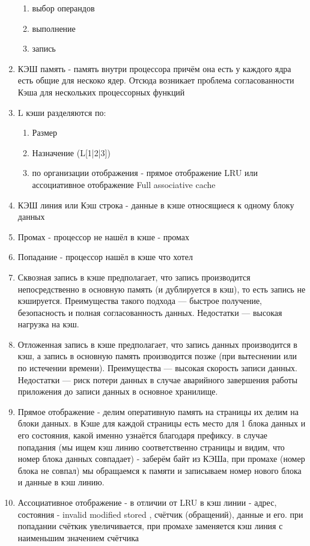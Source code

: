 \documentclass[a4paper,10pt]{article}
\begin{document}
\begin{enumerate}
\begin{enumerate}
        \item выбор операндов
        \item выполнение
        \item запись
    \end{enumerate}
    \item КЭШ память - память внутри процессора причём она есть у каждого ядра есть общие для нескоко ядер. Отсюда возникает проблема согласованности Кэша для нескольких процессорных функций
    \item L кэши разделяются по:
    \begin{enumerate}
        \item Размер
        \item Назначение (L[1|2|3])
        \item по организации отображения - прямое отображение LRU или ассоциативное отображение Full associative cache
    \end{enumerate}
    \item КЭШ линия или Кэш строка - данные в кэше относящиеся к одному блоку данных
    \item Промах - процессор не нашёл в кэше - промах
    \item Попадание - процессор нашёл в кэше что хотел
    \item Сквозная запись в кэше предполагает, что запись производится непосредственно в основную память (и дублируется в кэш), то есть запись не кэшируется. Преимущества такого подхода — быстрое получение, безопасность и полная согласованность данных. Недостатки — высокая нагрузка на кэш.
    \item Отложенная запись в кэше предполагает, что запись данных производится в кэш, а запись в основную память производится позже (при вытеснении или по истечении времени). Преимущества — высокая скорость записи данных. Недостатки — риск потери данных в случае аварийного завершения работы приложения до записи данных в основное хранилище.
    \item Прямое отображение - делим оперативную память на страницы их делим на блоки данных. в Кэше для каждой страницы есть место для 1 блока данных и его состояния, какой именно узнаётся благодаря префиксу. в случае попадания (мы ищем кэш линию соответственно страницы и видим, что номер блока данных совпадает) - заберём байт из КЭШа, при промахе (номер блока не совпал) мы обращаемся к памяти и записываем номер нового блока и данные в кэш линию.
    \item Ассоциативное отображение - в отличии от LRU в кэш линии - адрес, состояния - invalid modified stored , счётчик (обращений), данные и его. при попадании счёткик увеличивается, при промахе заменяется кэш линия с наименьшим значением счётчика

\end{enumerate}
\end{document}
